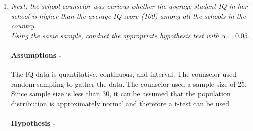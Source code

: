 \documentclass[12pt,letterpaper]{article}
\begin{document}
\begin{enumerate}
	\vspace{1cm}
	

	\[
	\begin{aligned}
	t^* = 1.711
	\end{aligned}
	\]
	
	
	Using the mean, t statistic, the standard deviation, and the sample size, calculate the confidence interval

	\[
	CI
	=
	\left(
	\bar{x} - t^*\frac{s}{\sqrt{n}},
	\bar{x} + t^*\frac{s}{\sqrt{n}}
	\right)
	\]
	
	\[
	lower bound=98.44-1.711 (\frac{13.09}{\sqrt{25}}).
	\]
	\[
	upper bound=98.44+1.711 (\frac{13.09}{\sqrt{25}}).
	\]
		
	\[
	CI=
	(\text{93.95993},\text{102.9201}).
	\]
	

	
	Therefore, it can be asserted with 90\% confidence that the average student IQ in the school is between 93.95993 and
	102.9201.
	
	
	\item \textit{Next, the school counselor was curious  whether  the average student IQ in her school is higher than the average IQ score (100) among all the schools in the country.}\\ 
	
	
	
	\noindent \textit{Using the same sample, conduct the appropriate hypothesis test with $\alpha=0.05$.}
	
	\paragraph{Assumptions -}
	The IQ data is quantitative, continuous, and interval. The counselor used random sampling to gather the data. The counselor used a  sample size of 25. Since sample size is less than 30, it can be assumed that the population distribution is approximately normal and therefore a t-test can be used. 
	\\
	\paragraph{Hypothesis -}\mbox{}


\end{enumerate}
\end{document}
